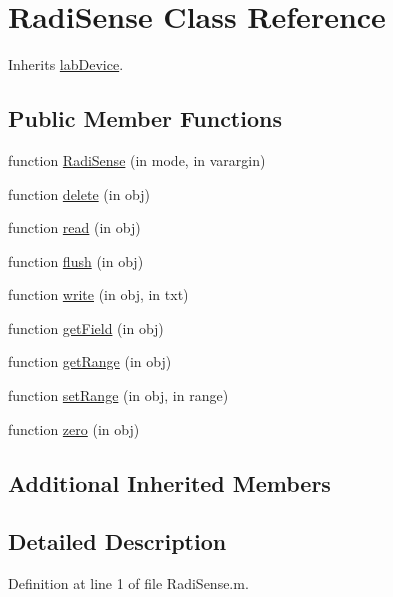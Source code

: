 \hypertarget{class_radi_sense}{}\section{Radi\+Sense Class Reference}
\label{class_radi_sense}


Inherits \hyperlink{classlab_device}{lab\+Device}.

\subsection*{Public Member Functions}
\begin{DoxyCompactItemize}
\item 
function \hyperlink{class_radi_sense_afd88dcc3dc7db6e8eb90fb0f6133b539}{Radi\+Sense} (in mode, in varargin)
\item 
function \hyperlink{class_radi_sense_a24924530e4a494754b1ffd9b009460a0}{delete} (in obj)
\item 
function \hyperlink{class_radi_sense_a1f6eb20634578c321ea383ca603b2472}{read} (in obj)
\item 
function \hyperlink{class_radi_sense_a14e284925808c1ac0cc824cd322dea54}{flush} (in obj)
\item 
function \hyperlink{class_radi_sense_af4c685aa61ea4df5974b162b802ca7cf}{write} (in obj, in txt)
\item 
function \hyperlink{class_radi_sense_a3040d0a926161631cde5fda9d8784606}{get\+Field} (in obj)
\item 
function \hyperlink{class_radi_sense_a28598667a6d81d20874b16c4be7bb0dd}{get\+Range} (in obj)
\item 
function \hyperlink{class_radi_sense_a5ffe9e38763cea717e6b68f7828a66da}{set\+Range} (in obj, in range)
\item 
function \hyperlink{class_radi_sense_ad44bfe112f5e39e967e035bc5069c31f}{zero} (in obj)
\end{DoxyCompactItemize}
\subsection*{Additional Inherited Members}


\subsection{Detailed Description}


Definition at line 1 of file Radi\+Sense.\+m.



